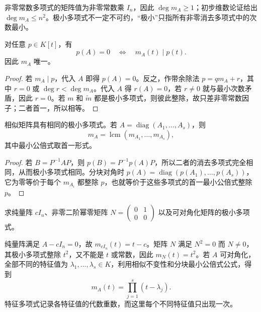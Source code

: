 非零常数多项式的矩阵值为非零常数乘 $I_n$，因此 $\deg m_A\geq1$；初步维数论证给出 $\deg m_A\leq n^2$。极小多项式不一定不可约，“极小”只指所有非零消去多项式中的次数最小。

\begin{theorem}[整除性质与唯一性]
\label{thm:xie-minimal-divisibility}
对任意 $p\in K[t]$，有
\begin{equation}
\label{eq:xie-minimal-divisibility}
 p(A)=0\quad\Longleftrightarrow\quad m_A(t)\mid p(t).
\end{equation}
因此 $m_A$ 唯一。
\end{theorem}
\begin{proof}
若 $m_A\mid p$，代入 $A$ 即得 $p(A)=0$。反之，作带余除法 $p=qm_A+r$，其中 $r=0$ 或 $\deg r<\deg m_A$。代入 $A$ 得 $r(A)=0$，若 $r\ne0$ 就与最小次数矛盾，因此 $r=0$。若 $m$ 和 $\widetilde m$ 都是极小多项式，则彼此整除，故只差非零常数因子；二者首一，所以相等。
\end{proof}

\begin{proposition}[相似与分块对角矩阵]
\label{prop:xie-minimal-block}
相似矩阵具有相同的极小多项式。若 $A=\operatorname{diag}(A_1,\ldots,A_s)$，则
\[
 m_A=\operatorname{lcm}(m_{A_1},\ldots,m_{A_s}),
\]
其中最小公倍式取首一形式。
\end{proposition}
\begin{proof}
若 $B=P^{-1}AP$，则 $p(B)=P^{-1}p(A)P$，所以二者的消去多项式完全相同，从而极小多项式相同。分块对角时 $p(A)=\operatorname{diag}(p(A_1),\ldots,p(A_s))$，它为零等价于每个 $m_{A_i}$ 都整除 $p$，也就等价于这些多项式的首一最小公倍式整除 $p$。
\end{proof}

\begin{example}
\label{ex:xie-minimal-basic}
求纯量阵 $cI_n$、非零二阶幂零矩阵 $N=\begin{pmatrix}0&1\\0&0\end{pmatrix}$ 以及可对角化矩阵的极小多项式。
\end{example}
\begin{solve}
纯量阵满足 $A-cI_n=0$，故 $m_{cI_n}(t)=t-c$。矩阵 $N$ 满足 $N^2=0$ 而 $N\ne0$，其极小多项式整除 $t^2$，又不能是 $t$ 或常数，因此 $m_N(t)=t^2$。若 $A$ 可对角化，全部不同的特征值为 $\lambda_1,\ldots,\lambda_s\in K$，利用相似不变性和分块最小公倍式公式，得到
\begin{equation}
\label{eq:xie-minimal-diagonalizable}
 m_A(t)=\prod_{j=1}^s(t-\lambda_j).
\end{equation}
特征多项式记录各特征值的代数重数，而这里每个不同特征值只出现一次。
\end{solve}

